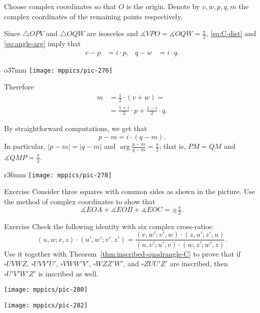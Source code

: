 Choose complex coordinates so that $O$ is the origin.
Denote by $v, w, p, q, m$ the complex coordinates of the remaining points respectively.

Since $\triangle OPV$ and $\triangle OQW$ are isosceles and $\measuredangle VPO=\measuredangle OQW=\tfrac\pi2$,
\ref{eq:C-dist} and \ref{eq:angle-arg} imply that
\begin{align*}
v-p&=i\cdot p,
&
q-w&=i\cdot q.
\end{align*}

\begin{wrapfigure}{o}{37mm}
\centering
\texttt{[image: mppics/pic-276]}
\end{wrapfigure}

Therefore
\begin{align*}
m
&=\tfrac12\cdot(v+w)=
\\
&=\tfrac{1+i}2\cdot p+\tfrac{1-i}2\cdot q.
\end{align*}

By straightforward computations, we get that
\[p-m=i\cdot (q-m).\]
In particular, $|p-m|=|q-m|$ and  $\arg\frac{p-m}{q-m}=\tfrac\pi2$;
that is, $PM=QM$ and $\measuredangle QMP =\tfrac\pi2$.  
\qeds

{

\begin{wrapfigure}{r}{36mm}
\vskip-4mm
\centering
\texttt{[image: mppics/pic-278]}
\end{wrapfigure}

\begin{thm}{Exercise}\label{ex:3-squares}
Consider three squares with common sides as shown in the picture.
Use the method of complex coordinates to show that 
\[\measuredangle EOA+\measuredangle EOB+\measuredangle EOC=\pm\tfrac\pi2.\]

\end{thm}

}

\begin{thm}{Exercise}\label{ex:6-circles}
Check the following identity with six complex cross-ratios:
\[(u,w;v,z)\cdot(u',w';v',z')=\frac{(v,w';v',w)\cdot(z,u';z',u)}{(u,v';u',v)\cdot(w,z';w',z)}.\]
Use it together with Theorem~\ref{thm:inscribed-quadrangle-C} to prove that if
$\square UVWZ$, $\square UVV'U'$, $\square VWW'V'$, $\square WZZ'W'$, and $\square ZUU'Z'$
are inscribed, then  $\square U'V'W'Z'$ is inscribed as well.

\end{thm}

\begin{minipage}{.47\textwidth}
\centering
\texttt{[image: mppics/pic-280]}
\end{minipage}
\hfill
\begin{minipage}{.47\textwidth}
\centering
\texttt{[image: mppics/pic-282]}
\end{minipage}

